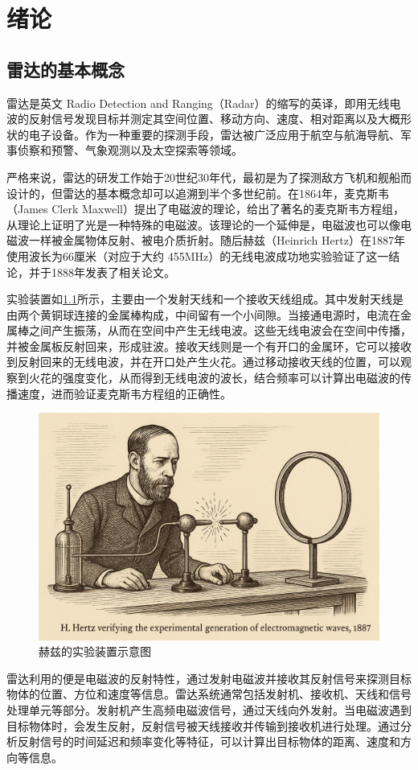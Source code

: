 \chapter{绪论}
\label{chp1}

\section{雷达的基本概念}
雷达是英文 Radio Detection and Ranging（Radar）的缩写的英译，即用无线电波的反射信号发现目标并测定其空间位置、移动方向、速度、相对距离以及大概形状的电子设备。作为一种重要的探测手段，雷达被广泛应用于航空与航海导航、军事侦察和预警、气象观测以及太空探索等领域。

严格来说，雷达的研发工作始于20世纪30年代，最初是为了探测敌方飞机和舰船而设计的，但雷达的基本概念却可以追溯到半个多世纪前。在1864年，麦克斯韦（James Clerk Maxwell）提出了电磁波的理论，给出了著名的麦克斯韦方程组，从理论上证明了光是一种特殊的电磁波。该理论的一个延伸是，电磁波也可以像电磁波一样被金属物体反射、被电介质折射。随后赫兹（Heinrich Hertz）在1887年使用波长为66厘米（对应于大约 455MHz）的无线电波成功地实验验证了这一结论，并于1888年发表了相关论文。

实验装置如\cref{fig_chp1_hertz}所示，主要由一个发射天线和一个接收天线组成。其中发射天线是由两个黄铜球连接的金属棒构成，中间留有一个小间隙。当接通电源时，电流在金属棒之间产生振荡，从而在空间中产生无线电波。这些无线电波会在空间中传播，并被金属板反射回来，形成驻波。接收天线则是一个有开口的金属环，它可以接收到反射回来的无线电波，并在开口处产生火花。通过移动接收天线的位置，可以观察到火花的强度变化，从而得到无线电波的波长，结合频率可以计算出电磁波的传播速度，进而验证麦克斯韦方程组的正确性。

\begin{figure}[htb!]
    \centering
    \includegraphics[width=.6\textwidth]{./img/intro/hertz_experiment.png}
    \caption{赫兹的实验装置示意图}
    \label{fig_chp1_hertz}
\end{figure}

雷达利用的便是电磁波的反射特性，通过发射电磁波并接收其反射信号来探测目标物体的位置、方位和速度等信息。雷达系统通常包括发射机、接收机、天线和信号处理单元等部分。发射机产生高频电磁波信号，通过天线向外发射。当电磁波遇到目标物体时，会发生反射，反射信号被天线接收并传输到接收机进行处理。通过分析反射信号的时间延迟和频率变化等特征，可以计算出目标物体的距离、速度和方向等信息。

